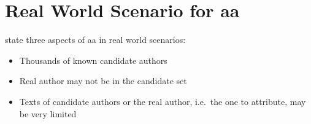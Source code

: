 \section{Real World Scenario for \ac{aa}}
\label{sec:real_world_scenario_authorship_attribution}

\citet{koppel_authorship_2011} state three aspects of \ac{aa} in real world scenarios:
\begin{itemize}
    \item Thousands of known candidate authors
    \item Real author may not be in the candidate set
    \item Texts of candidate authors or the real author, i.e.\ the one to attribute, may be very limited
\end{itemize}